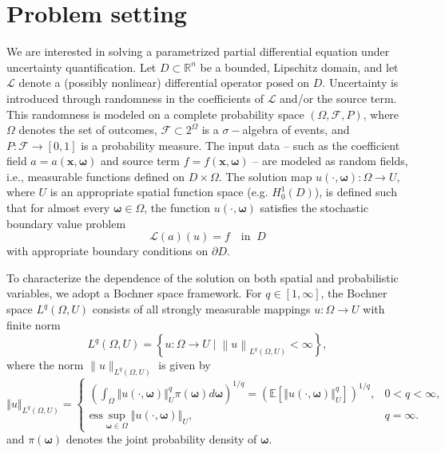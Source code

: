 \section{Problem setting}\label{sec:Problem_setting}
We are interested in solving a parametrized partial differential equation under uncertainty quantification. Let $D\subset \mathbb{R}^n$ be a bounded, Lipschitz domain, and let $\mathcal{L}$ denote a (possibly nonlinear) differential operator posed on $D$. Uncertainty is introduced through randomness in the coefficients of $\mathcal{L}$ and/or the source term. This randomness is modeled on a complete probability space $(\Omega, \mathcal{F}, P)$, where $\Omega$ denotes the set of outcomes, $\mathcal{F}\subset 2^{\Omega}$ is a $\sigma-$algebra of events, and $P:\mathcal{F}\rightarrow [0,1]$ is a probability measure. The input data -- such as the coefficient field $a=a(\boldsymbol x, \boldsymbol \omega)$ and source term $f = f(\boldsymbol x, \boldsymbol\omega)$ -- are modeled as random fields, i.e., measurable functions defined on $D\times \Omega$. The solution map $u(\cdot, \boldsymbol{\omega}): \Omega \to U$, where $U$ is an appropriate spatial function space (e.g. $H_0^1(D)$), is defined such that for almost every $\boldsymbol\omega\in \Omega$, the function $u(\cdot, \boldsymbol{\omega})$ satisfies the stochastic boundary value problem
%
\begin{equation}\label{eq:Problem}
    \mathcal{L}(a)(u) = f \quad \text{in} \;\; D
\end{equation}
%
with appropriate boundary conditions on $\partial D$. 


To characterize the dependence of the solution on both spatial and probabilistic variables, we adopt a Bochner space framework. For $q\in [1,\infty]$, the Bochner space $L^q(\Omega,U)$ consists of all strongly measurable mappings $u:\Omega\rightarrow U$ with finite norm
%
\[
L^q(\Omega,U) = \left\{u:\Omega\rightarrow U\; \bigg\vert \;\left\|u\right\|_{L^q(\Omega,U)}<\infty\right\},
\]
%
where the norm $\|u\|_{L^q(\Omega,U)}$ is given by
%
\[
\left\Vert u \right\Vert_{L^q(\Omega,U)} =\left\{\begin{array}{lll}
     \left(\int_{\Omega} \left\Vert u(\cdot,\boldsymbol{\omega})  \right\Vert_{U}^q \pi(\boldsymbol{\omega})d\boldsymbol{\omega} \right)^{1/q} = \left(\mathbb{E}\left[\left\Vert u(\cdot,\boldsymbol{\omega})  \right\Vert_{U}^q\right]\right)^{1/q}, & 0<q<\infty, \\
     \text{ess} \sup_{\boldsymbol{\omega}\in \Omega}\left\Vert u(\cdot,\boldsymbol{\omega})  \right\Vert_{U}, & q=\infty.
\end{array}
\right.
\]
and $\pi(\boldsymbol{\omega})$ denotes the joint probability density of $\boldsymbol{\omega}$.


